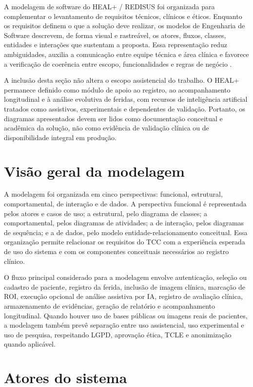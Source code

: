 \documentclass[
    12pt,
    oneside,
    a4paper,
    chapter=TITLE,
    brazil,
    sumario=tradicional,
    hidelinks
]{abntex2}
\begin{document}
A modelagem de software do HEAL+ / REDISUS foi organizada para complementar o levantamento de requisitos técnicos, clínicos e éticos. Enquanto os requisitos definem o que a solução deve realizar, os modelos de Engenharia de Software descrevem, de forma visual e rastreável, os atores, fluxos, classes, entidades e interações que sustentam a proposta. Essa representação reduz ambiguidades, auxilia a comunicação entre equipe técnica e área clínica e favorece a verificação de coerência entre escopo, funcionalidades e regras de negócio \cite{fernandes2017,pressman2016,guedes2018,wazlawick2013}.

A inclusão desta seção não altera o escopo assistencial do trabalho. O HEAL+ permanece definido como módulo de apoio ao registro, ao acompanhamento longitudinal e à análise evolutiva de feridas, com recursos de inteligência artificial tratados como assistivos, experimentais e dependentes de validação. Portanto, os diagramas apresentados devem ser lidos como documentação conceitual e acadêmica da solução, não como evidência de validação clínica ou de disponibilidade integral em produção.

\section{Visão geral da modelagem}

A modelagem foi organizada em cinco perspectivas: funcional, estrutural, comportamental, de interação e de dados. A perspectiva funcional é representada pelos atores e casos de uso; a estrutural, pelo diagrama de classes; a comportamental, pelos diagramas de atividades; a de interação, pelos diagramas de sequência; e a de dados, pelo modelo entidade-relacionamento conceitual. Essa organização permite relacionar os requisitos do TCC com a experiência esperada de uso do sistema e com os componentes conceituais necessários ao registro clínico.

O fluxo principal considerado para a modelagem envolve autenticação, seleção ou cadastro de paciente, registro da ferida, inclusão de imagem clínica, marcação de ROI, execução opcional de análise assistiva por IA, registro de avaliação clínica, armazenamento de evidências, geração de relatório e acompanhamento longitudinal. Quando houver uso de bases públicas ou imagens reais de pacientes, a modelagem também prevê separação entre uso assistencial, uso experimental e uso de pesquisa, respeitando LGPD, aprovação ética, TCLE e anonimização quando aplicável.

\section{Atores do sistema}
\end{document}
